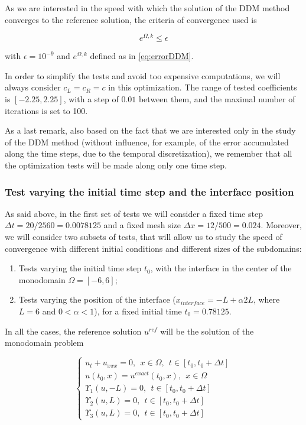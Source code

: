 \indent As we are interested in the speed with which the solution of the DDM method converges to the reference solution, the criteria of convergence used is

\begin{equation*}
\label{eq:criteriaConvergence}
	e^{\Omega,k} \leq \epsilon
\end{equation*}

\noindent with $\epsilon = 10^{-9}$ and $e^{\Omega,k}$ defined as in \eqref{eq:errorDDM}.
 
\indent In order to simplify the tests and avoid too expensive computations, we will always consider $c_L = c_R = c$ in this optimization. The range of tested coefficients is $[-2.25,2.25]$, with a step of $0.01$ between them, and the maximal number of iterations is set to 100.

\indent As a last remark, also based on the fact that we are interested only in the study of the DDM method (without influence, for example, of the error accumulated along the time steps, due to the temporal discretization), we remember that all the optimization tests will be made along only one time step.

\subsubsection{Test varying the initial time step and the interface position}

\indent As said above, in the first set of tests we will consider a fixed time step $\Delta t = 20/2560 = 0.0078125$ and a fixed mesh size $\Delta x = 12/500 = 0.024$. Moreover, we will consider two subsets of tests, that will allow us to study the speed of convergence with different initial conditions and different sizes of the subdomains:

\begin{enumerate}
	\item Tests varying the initial time step $t_0$, with the interface in the center of the monodomain $\Omega = [-6,6]$;
	\item Tests varying the position of the interface ($x_{interface} = -L + \alpha 2L$, where $L = 6$ and $0 < \alpha < 1$), for a fixed initial time $t_0 = 0.78125$.
\end{enumerate}

\indent In all the cases, the reference solution $u^{ref}$ will be the solution of the monodomain problem

\begin{equation*}
	\begin{cases}
	u_t + u_{xxx} = 0, \ \ x \in \Omega, \ \ t \in [t_0, t_0+\Delta t] \\
	u(t_0,x) = u^{exact}(t_0,x) , \ \ x \in \Omega \\ 
	\Upsilon_1(u,-L) = 0, \ \ t \in [t_0, t_0+\Delta t] \\
	\Upsilon_2(u,L) = 0, \ \ t \in [t_0, t_0+\Delta t] \\
	\Upsilon_3(u,L) = 0, \ \ t \in [t_0, t_0+\Delta t]
	\end{cases}
\end{equation*}

